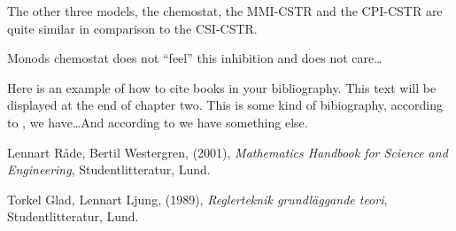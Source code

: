 \documentclass[a4paper, 10pt, twoside, openright]{book}
\begin{document}


The other three models, the chemostat, the MMI-CSTR and the CPI-CSTR
are quite similar in comparison to the CSI-CSTR. 

Monods chemostat does not ``feel'' this inhibition and does not care\ldots 







%
Here is an example of how to cite books in your bibliography. This
text will be displayed at the end of chapter two. This is some kind of
bibiography, according to \cite{beta}, we have\ldots And according to
\cite{beta,Glad} we have something else.

\begin{thebibliography}{99}

Lennart Råde, Bertil Westergren, 
(2001), 
\emph{Mathematics Handbook for Science and Engineering},
Studentlitteratur, 
Lund.

Torkel Glad, Lennart Ljung,
(1989), 
\emph{Reglerteknik grundläggande teori},
Studentlitteratur, 
Lund.

\end{thebibliography}
\end{document}
